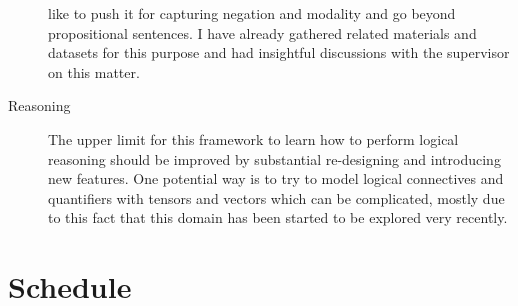 \begin{description}
like to push it for capturing negation and modality and go beyond propositional sentences. I have already gathered related
materials and datasets for this purpose and had insightful discussions with the
supervisor on this matter.
  \item[Reasoning] The upper limit
for this framework to learn how to perform logical reasoning should be improved
by substantial re-designing and introducing new features. One potential way is
to try to model logical connectives and quantifiers with tensors and vectors
which can be complicated, mostly due to this fact that this domain has been
started to be explored very recently.

\end{description}

\section{Schedule}
\label{sec:sch}
